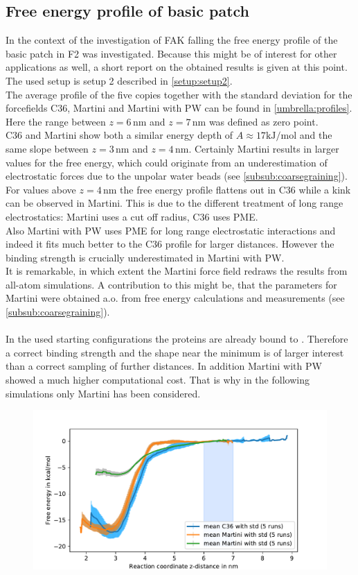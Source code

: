 \subsection{Free energy profile of basic patch}
In the context of the investigation of FAK falling the free energy profile of the basic patch in F2 was investigated. Because this might be of interest for other applications as well, a short report on the obtained results is given at this point. The used setup is setup 2 described in \autoref{setup:setup2}.\\
The average profile of the five copies together with the standard deviation for the forcefields C36, Martini and Martini with PW can be found in \autoref{umbrella:profiles}. Here the range between $z = 6\,\si{\nano\metre}$ and $z = 7\,\si{\nano\metre}$ was defined as zero point.\\
C36 and Martini show both a similar energy depth of $A \approx 17 \si{\kilo\joule/\mole}$ and the same slope between $z = 3\,\si{\nano\metre}$ and $z = 4\,\si{\nano\metre}$. Certainly Martini results in larger values for the free energy, which could originate from an underestimation of electrostatic forces due to the unpolar water beads (see \autoref{subsub:coarsegraining}). For values above $z = 4\,\si{\nano\metre}$ the free energy profile flattens out in C36 while a kink can be observed in Martini. This is due to the different treatment of long range electrostatics: Martini uses a cut off radius, C36 uses PME.\\
Also Martini with PW uses PME for long range electrostatic interactions and indeed it fits much better to the C36 profile for larger distances. However the binding strength is crucially underestimated in Martini with PW.\\
It is remarkable, in which extent the Martini force field redraws the results from all-atom simulations. A contribution to this might be, that the parameters for Martini were obtained a.o. from free energy calculations and measurements (see \autoref{subsub:coarsegraining}).\\
\\
In the used starting configurations the proteins are already bound to \pip{}. Therefore a correct binding strength and the shape near the minimum is of larger interest than a correct sampling of further distances. In addition Martini with PW showed a much higher computational cost. That is why in the following simulations only Martini has been considered.
%
%
%
\begin{figure}
	\centering
	\includegraphics[width=.8\textwidth]{figures/results/umbrella}
	\label{umbrella:profiles}
\end{figure}
%
%
%